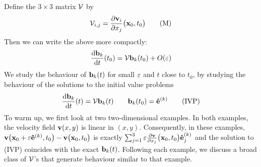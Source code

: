 Define the $3\times 3$ matrix $\mathcal{V}$ by
\begin{equation}
\mathcal{V}_{i,j}=\frac{\partial \mathbf{v}_i}{\partial x_j}\big(\mathbf{x}_0,t_0\big)
\tag{M}\end{equation}
Then we can write the above more compactly:
\begin{equation*}
\diff{\vb_k}{t}(t_0)=\cV\vb_k(t_0)+O(\veps)
\end{equation*}
We study the behaviour of $\mathbf{b}_k(t)$ for small $\varepsilon$  and $t$ close to
$t_0$, by studying the behaviour of the solutions to the initial value problems
\begin{equation}
\diff{\vb_k}{t}(t)=\cV\vb_k(t)\qquad \vb_k(t_0)=\ha{k}
\tag{IVP}\end{equation}
To warm up, we first look at two two-dimensional examples. In both 
examples, the velocity field $\mathbf{v}(x,y)$ is linear in $(x,y)$. 
Consequently, in these examples, $\mathbf{v}\big(\mathbf{x}_0+\varepsilon\mathbf{\hat e}^{(k)},t_0\big)-\mathbf{v}\big(\mathbf{x}_0,t_0\big)$
is exactly $\mathop{{\textstyle \sum}}_{j=1}^3\varepsilon\frac{\partial\mathbf{v}}
{\partial x_j}\big(\mathbf{x}_0,t_0\big)\mathbf{\hat e}^{(k)}_j$ and 
 the solution to (IVP) coincides with the exact $\mathbf{b}_k(t)$.
Following each example, we discuss a broad class of $\mathcal{V}$'s that generate  
behaviour similar to that example. 

